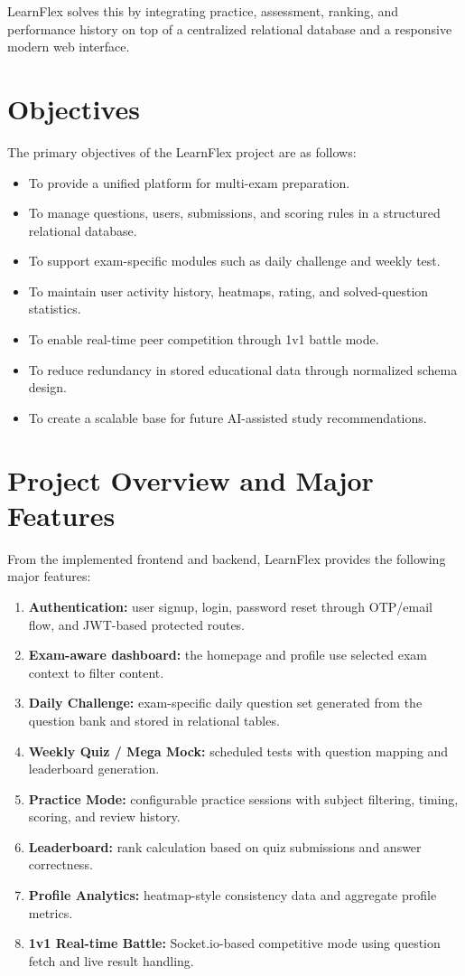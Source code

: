 \documentclass[12pt,a4paper]{article}
\begin{document}
LearnFlex solves this by integrating practice, assessment, ranking, and performance history on top of a centralized relational database and a responsive modern web interface.

\section{Objectives}
The primary objectives of the LearnFlex project are as follows:

\begin{itemize}[leftmargin=1.5em]
  \item To provide a unified platform for multi-exam preparation.
  \item To manage questions, users, submissions, and scoring rules in a structured relational database.
  \item To support exam-specific modules such as daily challenge and weekly test.
  \item To maintain user activity history, heatmaps, rating, and solved-question statistics.
  \item To enable real-time peer competition through 1v1 battle mode.
  \item To reduce redundancy in stored educational data through normalized schema design.
  \item To create a scalable base for future AI-assisted study recommendations.
\end{itemize}

\section{Project Overview and Major Features}
From the implemented frontend and backend, LearnFlex provides the following major features:

\begin{enumerate}[leftmargin=1.5em]
  \item \textbf{Authentication:} user signup, login, password reset through OTP/email flow, and JWT-based protected routes.
  \item \textbf{Exam-aware dashboard:} the homepage and profile use selected exam context to filter content.
  \item \textbf{Daily Challenge:} exam-specific daily question set generated from the question bank and stored in relational tables.
  \item \textbf{Weekly Quiz / Mega Mock:} scheduled tests with question mapping and leaderboard generation.
  \item \textbf{Practice Mode:} configurable practice sessions with subject filtering, timing, scoring, and review history.
  \item \textbf{Leaderboard:} rank calculation based on quiz submissions and answer correctness.
  \item \textbf{Profile Analytics:} heatmap-style consistency data and aggregate profile metrics.
  \item \textbf{1v1 Real-time Battle:} Socket.io-based competitive mode using question fetch and live result handling.
\end{enumerate}
\end{document}
